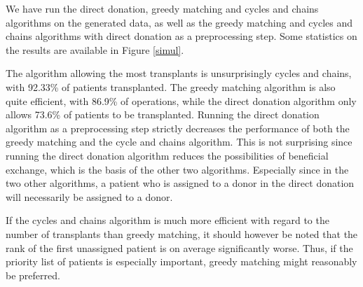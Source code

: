 \documentclass[english]{article}
\begin{document}
We have run the direct donation, greedy matching and cycles and chains algorithms on the generated data, as well as the greedy matching and cycles and chains algorithms with direct donation as a preprocessing step. Some statistics on the results are available in Figure \ref{simul}.

The algorithm allowing the most transplants is unsurprisingly cycles and chains, with 92.33\% of patients transplanted. The greedy matching algorithm is also quite efficient, with 86.9\% of operations, while the direct donation algorithm only allows 73.6\% of patients to be transplanted. Running the direct donation algorithm as a preprocessing step strictly decreases the performance of both the greedy matching and the cycle and chains algorithm. This is not surprising since running the direct donation algorithm reduces the possibilities of beneficial exchange, which is the basis of the other two algorithms. Especially since in the two other algorithms, a patient who is assigned to a donor in the direct donation will necessarily be assigned to a donor.

If the cycles and chains algorithm is much more efficient with regard to the number of transplants than greedy matching, it should however be noted that the rank of the first unassigned patient is on average significantly worse. Thus, if the priority list of patients is especially important, greedy matching might reasonably be preferred.
\end{document}

